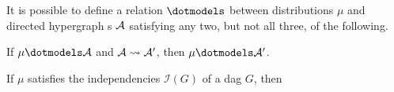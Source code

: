 \begin{theorem}\label{theorem:mrf-bn-monotone-impossible}
    It is possible to define a  relation  $\dotmodels$ 
        between distributions $\mu$ and directed hypergraph s $\mathcal A$
    satisfying 
    any two, but not all three, of the
    following.
    \begin{description}[itemsep=0pt,parsep=0.3ex,topsep=0pt]
        \item [\rm(monotonicity)]
            If $\mu \dotmodels \Ar$
            and $\mathcal A \rightsquigarrow \mathcal A'$,
            then
            $\mu \dotmodels \Ar'$.
        \item [\rm(positive BN capture)]
            If $\mu$ satisfies the independencies
            $\mathcal I(G)$ of a dag $G$,
            then

\end{description}
\end{theorem}
